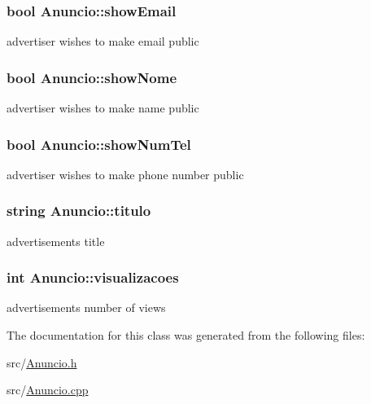 \subsubsection[{show\+Email}]{\setlength{\rightskip}{0pt plus 5cm}bool Anuncio\+::show\+Email\hspace{0.3cm}{\ttfamily [protected]}}\label{class_anuncio_a6a41218c0a11ba393522d3a9a80ded95}
advertiser wishes to make email public \hypertarget{class_anuncio_a50feea41d2253cd5168243b18fa03aa6}{}
\subsubsection[{show\+Nome}]{\setlength{\rightskip}{0pt plus 5cm}bool Anuncio\+::show\+Nome\hspace{0.3cm}{\ttfamily [protected]}}\label{class_anuncio_a50feea41d2253cd5168243b18fa03aa6}
advertiser wishes to make name public \hypertarget{class_anuncio_a8db5dc7339e63974c643a6602f2cf7bc}{}
\subsubsection[{show\+Num\+Tel}]{\setlength{\rightskip}{0pt plus 5cm}bool Anuncio\+::show\+Num\+Tel\hspace{0.3cm}{\ttfamily [protected]}}\label{class_anuncio_a8db5dc7339e63974c643a6602f2cf7bc}
advertiser wishes to make phone number public \hypertarget{class_anuncio_adb34bedd8220f42b9ee37662c21313e6}{}
\subsubsection[{titulo}]{\setlength{\rightskip}{0pt plus 5cm}string Anuncio\+::titulo\hspace{0.3cm}{\ttfamily [protected]}}\label{class_anuncio_adb34bedd8220f42b9ee37662c21313e6}
advertisement\textquotesingle{}s title \hypertarget{class_anuncio_ae3fb8cd61ec06485ee166cd3b5d80804}{}
\subsubsection[{visualizacoes}]{\setlength{\rightskip}{0pt plus 5cm}int Anuncio\+::visualizacoes\hspace{0.3cm}{\ttfamily [protected]}}\label{class_anuncio_ae3fb8cd61ec06485ee166cd3b5d80804}
advertisement\textquotesingle{}s number of views 

The documentation for this class was generated from the following files\+:\begin{DoxyCompactItemize}
\item 
src/\hyperlink{_anuncio_8h}{Anuncio.\+h}\item 
src/\hyperlink{_anuncio_8cpp}{Anuncio.\+cpp}\end{DoxyCompactItemize}
